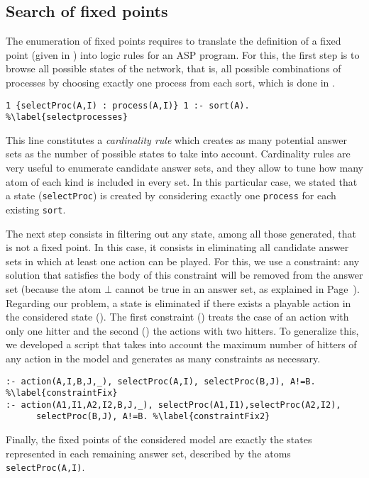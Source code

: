 \subsection{Search of fixed points}

The enumeration of fixed points requires to translate the definition of a fixed point (given in )
into logic rules for an ASP program. For this, the first step is to browse all possible states of the network,
that is, all possible combinations of processes by choosing exactly one process from each sort, which is done in .
\begin{lstlisting}
1 {selectProc(A,I) : process(A,I)} 1 :- sort(A). %\label{selectprocesses}
\end{lstlisting}
This line constitutes a \emph{cardinality rule} which creates as many potential answer sets as the number of possible states
to take into account.
Cardinality rules are very useful to enumerate candidate answer sets,
and they allow to tune how many atom of each kind is included in every set.
In this particular case, we stated that a state (\texttt{selectProc})
is created by considering exactly one \texttt{process} for each existing \texttt{sort}.

The next step consists in filtering out any state, among all those generated,
that is not a fixed point.
In this case, it consists in eliminating all candidate answer sets
in which at least one action can be played.
For this, we use a constraint:
any solution that satisfies the body of this constraint will be removed from the answer set (because the atom $\bot$ cannot be true in an answer set, as explained in Page~\pageref{constraint}).
Regarding our problem, a state is eliminated if there exists a playable action in the considered state (). The first constraint () treats the case of an action with only one hitter and the second () the actions with two hitters.
To generalize this, we developed a script that takes into account the maximum number of hitters of any action in the model and generates as many constraints as necessary.
\begin{lstlisting}
:- action(A,I,B,J,_), selectProc(A,I), selectProc(B,J), A!=B. %\label{constraintFix}
:- action(A1,I1,A2,I2,B,J,_), selectProc(A1,I1),selectProc(A2,I2), 
      selectProc(B,J), A!=B. %\label{constraintFix2}
\end{lstlisting}
Finally, the fixed points of the considered model are exactly the states represented in each remaining answer set,
described by the atoms \texttt{selectProc(A,I)}.


